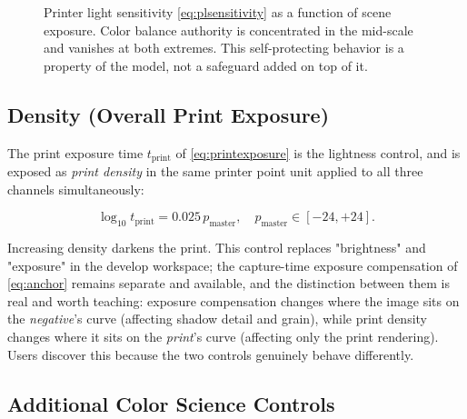 \begin{figure}[htbp]
\centering
{}
\caption{Printer light sensitivity \eqref{eq:plsensitivity} as a function of scene exposure. Color balance authority is concentrated in the mid-scale and vanishes at both extremes. This self-protecting behavior is a property of the model, not a safeguard added on top of it.}
\label{fig:plresponse}
\end{figure}

\subsection{Density (Overall Print Exposure)}

The print exposure time $t_{\mathrm{print}}$ of \eqref{eq:printexposure} is the
lightness control, and is exposed as \emph{print density} in the same printer
point unit applied to all three channels simultaneously:

\begin{equation}
\log_{10} t_{\mathrm{print}} = 0.025\, p_{\mathrm{master}}, \quad p_{\mathrm{master}} \in [-24, +24].
\end{equation}

Increasing density darkens the print. This control replaces "brightness" and
"exposure" in the develop workspace; the capture-time exposure compensation of
\eqref{eq:anchor} remains separate and available, and the distinction between
them is real and worth teaching: exposure compensation changes where the image
sits on the \emph{negative}'s curve (affecting shadow detail and grain), while
print density changes where it sits on the \emph{print}'s curve (affecting only
the print rendering). Users discover this because the two controls genuinely
behave differently.

\subsection{Additional Color Science Controls}

